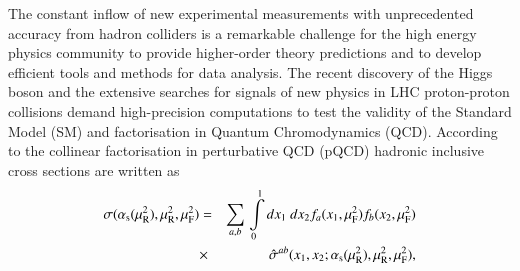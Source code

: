 The constant inflow of new experimental measurements 
with unprecedented accuracy from hadron colliders is a remarkable challenge 
for the high energy physics community to provide higher-order theory 
predictions and to develop efficient tools and methods for data analysis.
The recent discovery of the Higgs boson \cite{Aad:2012tfa,Chatrchyan:2012ufa} 
and the extensive searches
for signals of new physics in LHC proton-proton collisions
demand high-precision computations to test the validity of the Standard Model (SM)
and factorisation in Quantum Chromodynamics (QCD).
According to the collinear factorisation in perturbative QCD (pQCD)
hadronic inclusive cross sections are written as
%
\begin{eqnarray}
\small
%
\sigma(\as(\mur^2),\mur^2,\muf^2)&=& \sum\limits_{a,b}\,  \int\limits_{0}\limits^{1} dx_1\ dx_2  f_a(x_1,\muf^2) f_b(x_2,\muf^2) \nonumber \\ 
&\times&  \, \hat{\sigma}^{ab}(x_1,x_2;\as(\mur^2),\mur^2,\muf^2),
\label{eq:fact}
\end{eqnarray}
